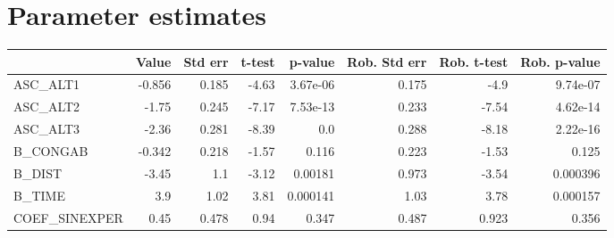 \section{Parameter estimates}
\begin{tabular}{lrrrrrrr}
\toprule
{} &  Value &  Std err &  t-test &  p-value &  Rob. Std err &  Rob. t-test &  Rob. p-value \\
\midrule
ASC\_ALT1      & -0.856 &    0.185 &   -4.63 & 3.67e-06 &         0.175 &         -4.9 &      9.74e-07 \\
ASC\_ALT2      &  -1.75 &    0.245 &   -7.17 & 7.53e-13 &         0.233 &        -7.54 &      4.62e-14 \\
ASC\_ALT3      &  -2.36 &    0.281 &   -8.39 &      0.0 &         0.288 &        -8.18 &      2.22e-16 \\
B\_CONGAB      & -0.342 &    0.218 &   -1.57 &    0.116 &         0.223 &        -1.53 &         0.125 \\
B\_DIST        &  -3.45 &      1.1 &   -3.12 &  0.00181 &         0.973 &        -3.54 &      0.000396 \\
B\_TIME        &    3.9 &     1.02 &    3.81 & 0.000141 &          1.03 &         3.78 &      0.000157 \\
COEF\_SINEXPER &   0.45 &    0.478 &    0.94 &    0.347 &         0.487 &        0.923 &         0.356 \\
\bottomrule
\end{tabular}

